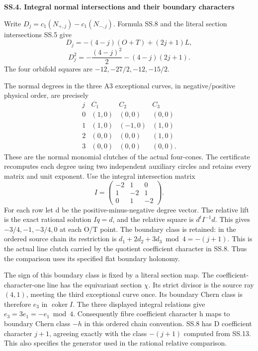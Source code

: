 \par

\medskip\noindent\textbf{SS.4. Integral normal intersections and their boundary characters}

\par\nobreak

Write \(D_j=c_1(N_{+,j})-c_1(N_{-,j})\). Formula SS.8
and the literal section intersections SS.5 give
\[
 D_j=-(4-j)(O+T)+(2j+1)L,
\]
\[
 D_j^2=-\frac{(4-j)^2}{2}-(4-j)(2j+1).
 \tag{SS.12}
\]
The four orbifold squares are
\(-12,-27/2,-12,-15/2\).

The normal degrees in the three A3 exceptional curves,
in negative/positive physical order, are precisely
\[
\begin{array}{c|ccc}
 j&C_1&C_2&C_3\\\hline
 0&(1,0)&(0,0)&(0,0)\\
 1&(1,0)&(-1,0)&(1,0)\\
 2&(0,0)&(0,0)&(1,0)\\
 3&(0,0)&(0,0)&(0,0).
\end{array}
 \tag{SS.13}
\]
These are the normal monomial clutches of the actual
four-cones. The certificate recomputes each degree
using two independent auxiliary circles and retains
every matrix and unit exponent. Use the integral
intersection matrix
\[
 I=\begin{pmatrix}-2&1&0\\1&-2&1\\0&1&-2\end{pmatrix}.
\]
For each row let d be the positive-minus-negative
degree vector. The relative lift is the exact rational
solution \(Iq=d\), and the relative square is
\(d^tI^{-1}d\). This gives
\(-3/4,-1,-3/4,0\) at each O/T point. The boundary
class is retained: in the ordered source chain its
restriction is \(d_1+2d_2+3d_3\bmod4=-(j+1)\).
This is the actual line clutch carried by the
quotient coefficient character in SS.8. Thus the
comparison uses its specified flat boundary holonomy.

The sign of this boundary class is fixed by a literal
section map. The coefficient-character-one line has
the equivariant section \(\chi\). Its strict divisor
is the source ray \((4,1)\), meeting the third
exceptional curve once. Its boundary Chern class is
therefore \(e_3\) in \(\operatorname{coker}I\).
The three displayed integral relations give
\(e_3=3e_1=-e_1\bmod4\). Consequently fibre
coefficient character h maps to boundary Chern
class \(-h\) in this ordered chain convention.
SS.8 has D coefficient character \(j+1\), agreeing
exactly with the class \(-(j+1)\) computed from
SS.13. This also specifies the generator used in
the rational relative comparison.

